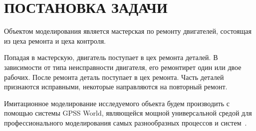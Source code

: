 \section[Постановка задачи]{ПОСТАНОВКА ЗАДАЧИ}

Объектом моделирования является мастерская по ремонту двигателей,
состоящая из цеха ремонта и цеха контроля.

Попадая в мастерскую, двигатель поступает в цех ремонта деталей. В зависимости
от типа неисправности двигателя, его ремонтирет один или двое рабочих. После
ремонта деталь поступает в цех ремонта. Часть деталей признаются исправными,
некоторые направляются на повторный ремонт.

Имитационное моделирование исследуемого объекта будем производить
с помощью системы GPSS World, являющейся мощной универсальной средой
для профессионального моделирования самых разнообразных процессов
и систем~\cite{ims_batin_2,ims_kudryavtsev,ims_tomashevskiy,ims_boev,ims_shraiber}.

\pagebreak
